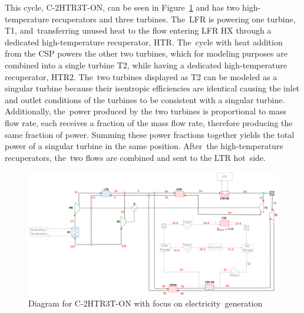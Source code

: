 \documentclass[sustainability,article,accept,moreauthors,pdftex]{Definitions/mdpi}
\begin{document}
\begin{paracol}{2}
This cycle, C-2HTR3T-ON, can be seen in Figure~\ref{c-2htr3t-on} and has two high-temperature recuperators and three turbines. The~LFR is powering one turbine, T1, and~transferring unused heat to the flow entering LFR HX through a dedicated high-temperature recuperator, HTR. The~cycle with heat addition from the CSP powers the other two turbines, which for modeling purposes are combined into a single turbine T2, while having a dedicated high-temperature recuperator, HTR2. The~two turbines displayed as T2 can be modeled as a singular turbine because their isentropic efficiencies are identical causing the inlet and outlet conditions of the turbines to be consistent with a singular turbine. Additionally, the~power produced by the two turbines is proportional to mass flow rate, each receives a fraction of the mass flow rate, therefore producing the same fraction of power. Summing these power fractions together yields the total power of a singular turbine in the same position. After~the high-temperature recuperators, the~two flows are combined and sent to the LTR hot~side. 

\end{paracol}
\begin{figure}[H]
    \widefigure
    \includegraphics[width=\linewidth]{Definitions/c-2htr3t-on.pdf}
    \caption{Diagram for C-2HTR3T-ON with focus on electricity~generation\label{c-2htr3t-on}}
\end{figure}
\end{document}
